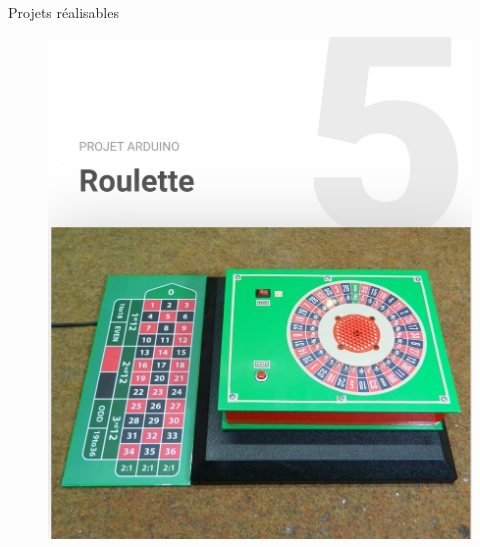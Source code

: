 \documentclass[]{beamer}
\begin{document}
	\begin{frame}
	{Projets réalisables}
			\begin{figure}
				\begin{center}
					\includegraphics[scale=0.4]{roulette.png}
				\end{center}
			\end{figure}
	\end{frame}
\end{document}
